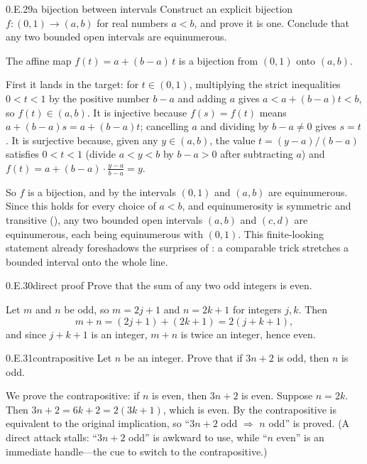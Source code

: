 \documentclass[main.tex]{subfiles}
\begin{document}
\begin{Exercise}{0.E.29}{a bijection between intervals}
Construct an explicit bijection $f\colon(0,1)\to(a,b)$ for real numbers $a<b$, and prove it is one.
Conclude that any two bounded open intervals are equinumerous.
\end{Exercise}
\begin{Solution}
The affine map $f(t)=a+(b-a)\,t$ is a bijection from $(0,1)$ onto $(a,b)$.

First it lands in the target: for $t\in(0,1)$, multiplying the strict inequalities $0<t<1$ by the
positive number $b-a$ and adding $a$ gives $a<a+(b-a)t<b$, so $f(t)\in(a,b)$. It is injective because
$f(s)=f(t)$ means $a+(b-a)s=a+(b-a)t$; cancelling $a$ and dividing by $b-a\neq 0$ gives $s=t$. It is
surjective because, given any $y\in(a,b)$, the value $t=(y-a)/(b-a)$ satisfies $0<t<1$ (divide
$a<y<b$ by $b-a>0$ after subtracting $a$) and $f(t)=a+(b-a)\cdot\frac{y-a}{b-a}=y$.

So $f$ is a bijection, and by  the intervals $(0,1)$ and $(a,b)$ are equinumerous. Since
this holds for every choice of $a<b$, and equinumerosity is symmetric and transitive (),
any two bounded open intervals $(a,b)$ and $(c,d)$ are equinumerous, each being equinumerous with
$(0,1)$. This finite-looking statement already foreshadows the surprises of : a comparable
trick stretches a bounded interval onto the whole line.
\end{Solution}
\par\bigskip{}\par\nobreak\smallskip

\begin{Exercise}{0.E.30}{direct proof}
Prove that the sum of any two odd integers is even.
\end{Exercise}
\begin{Solution}
Let $m$ and $n$ be odd, so $m=2j+1$ and $n=2k+1$ for integers $j,k$. Then
\[
m+n=(2j+1)+(2k+1)=2(j+k+1),
\]
and since $j+k+1$ is an integer, $m+n$ is twice an integer, hence even.
\end{Solution}

\begin{Exercise}{0.E.31}{contrapositive}
Let $n$ be an integer. Prove that if $3n+2$ is odd, then $n$ is odd.
\end{Exercise}
\begin{Solution}
We prove the contrapositive: if $n$ is even, then $3n+2$ is even. Suppose $n=2k$. Then
$3n+2=6k+2=2(3k+1)$, which is even. By  the contrapositive is equivalent to the original
implication, so ``$3n+2$ odd $\Rightarrow$ $n$ odd'' is proved. (A direct attack stalls: ``$3n+2$
odd'' is awkward to use, while ``$n$ even'' is an immediate handle---the cue to switch to the
contrapositive.)
\end{Solution}
\end{document}
